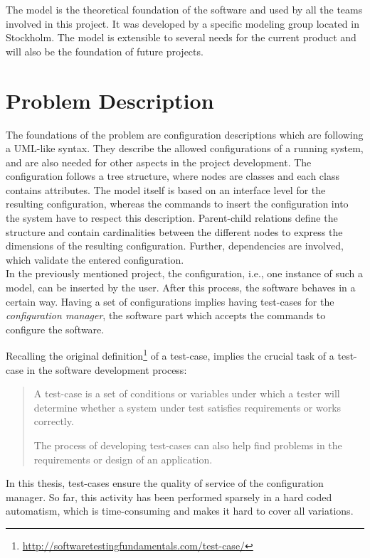 The model is the theoretical foundation of the software and used by all the teams involved in this project. It was developed by a specific modeling group located in Stockholm. The model is extensible to several needs for the current product and will also be the foundation of future projects.

\section{Problem Description}\label{sec:problem-description}


The foundations of the problem are configuration descriptions which are following a UML-like syntax. They describe the allowed configurations of a running system, and are also needed for other aspects in the project development.
The configuration follows a tree structure, where nodes are classes and each class contains attributes. The model itself is based on an interface level for the resulting configuration, whereas the commands to insert the configuration into the system have to respect this description. Parent-child relations define the structure and contain cardinalities between the different nodes to express the dimensions of the resulting configuration. Further, dependencies are involved, which validate the entered configuration.\\

In the previously mentioned project, the configuration, i.e., one instance of such a model, can be inserted by the user. After this process, the software behaves in a certain way.  
Having a set of configurations implies having test-cases for the \emph{configuration manager}, the software part which accepts the commands to configure the software. 

Recalling the original definition\footnote{\url{http://softwaretestingfundamentals.com/test-case/}} of a test-case, implies the crucial task of a test-case in the software development process:

\begin{quote}
A test-case is a set of conditions or variables under which a tester will determine whether a system under test satisfies requirements or works correctly.

The process of developing test-cases can also help find problems in the requirements or design of an application.
\end{quote}

In this thesis, test-cases ensure the quality of service of the configuration manager. So far, this activity has been performed sparsely in a hard coded automatism, which is time-consuming and makes it hard to cover all variations.\\

